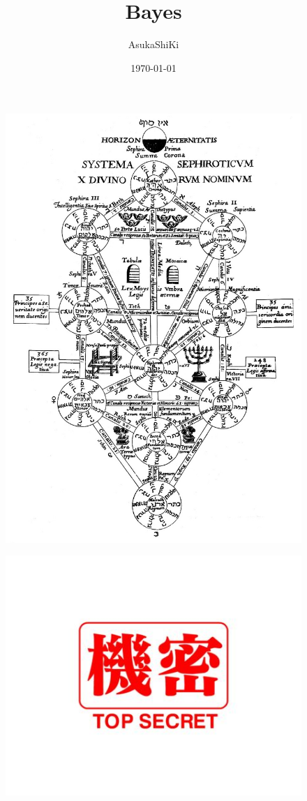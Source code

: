\documentclass[UTF8]{ctexart}
\title{Bayes}
\author{AsukaShiKi}
\date{\today}
\begin{document}
\maketitle
\par
\begin{figure}[ht]
    \centering
    \includegraphics[scale=1.3]{01.jpg}
\end{figure}
\begin{figure}[ht]
    \centering
    \includegraphics[scale=0.3]{02.jpg}
\end{figure}
\end{document}
